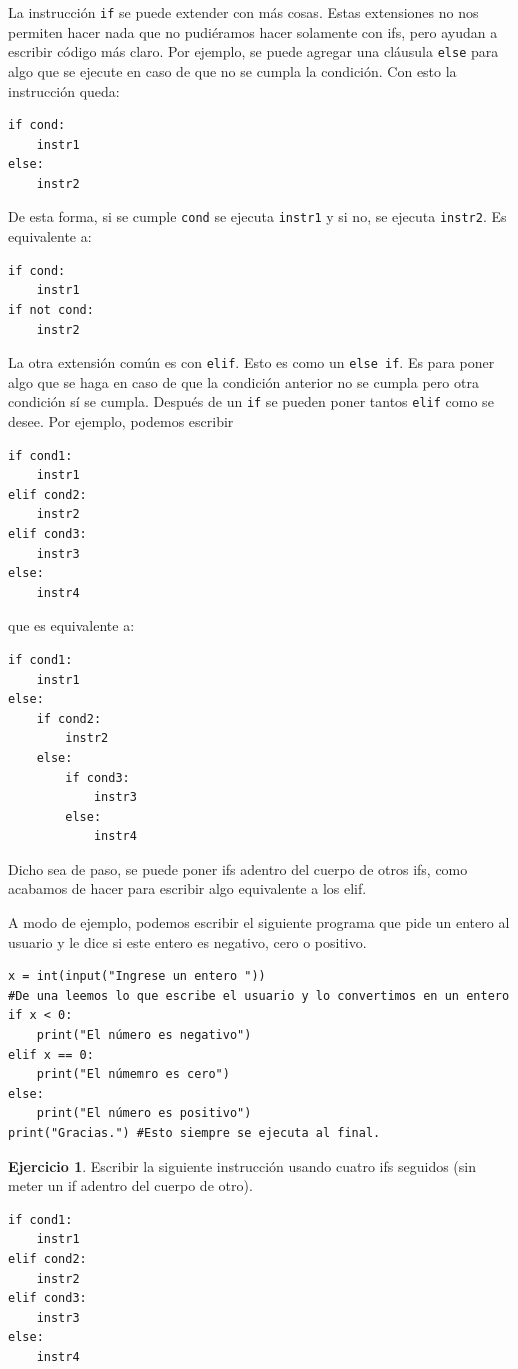 \documentclass[a4paper, 12pt]{report}
\theoremstyle{definition}
\newtheorem{ejercicio}{Ejercicio}[section]
\begin{document}
La instrucción {\tt if} se puede extender con más cosas. Estas extensiones no nos permiten hacer nada que no pudiéramos hacer solamente con ifs, pero ayudan a escribir código más claro. Por ejemplo, se puede agregar una cláusula {\tt else} para algo que se ejecute en caso de que no se cumpla la condición. Con esto la instrucción queda:
\begin{verbatim}
if cond:
    instr1
else:
    instr2
\end{verbatim}
De esta forma, si se cumple {\tt cond} se ejecuta {\tt instr1} y si no, se ejecuta {\tt instr2}. Es equivalente a:
\begin{verbatim}
if cond:
    instr1
if not cond:
    instr2
\end{verbatim}

La otra extensión común es con {\tt elif}. Esto es como un {\tt else if}. Es para poner algo que se haga en caso de que la condición anterior no se cumpla pero otra condición sí se cumpla. Después de un {\tt if} se pueden poner tantos {\tt elif} como se desee. Por ejemplo, podemos escribir
\begin{verbatim}
if cond1:
    instr1
elif cond2:
    instr2
elif cond3:
    instr3
else:
    instr4
\end{verbatim}
que es equivalente a:
\begin{verbatim}
if cond1:
    instr1
else:
    if cond2:
        instr2
    else:
        if cond3:
            instr3
        else:
            instr4
\end{verbatim}
Dicho sea de paso, se puede poner ifs adentro del cuerpo de otros ifs, como acabamos de hacer para escribir algo equivalente a los elif.

A modo de ejemplo, podemos escribir el siguiente programa que pide un entero al usuario y le dice si este entero es negativo, cero o positivo.
\begin{verbatim}
x = int(input("Ingrese un entero "))
#De una leemos lo que escribe el usuario y lo convertimos en un entero
if x < 0:
    print("El número es negativo")
elif x == 0:
    print("El númemro es cero")
else:
    print("El número es positivo")
print("Gracias.") #Esto siempre se ejecuta al final.
\end{verbatim}

\begin{ejercicio}
	Escribir la siguiente instrucción usando cuatro ifs seguidos (sin meter un if adentro del cuerpo de otro).
\begin{verbatim}
if cond1:
    instr1
elif cond2:
    instr2
elif cond3:
    instr3
else:
    instr4
\end{verbatim}

\end{ejercicio}
\end{document}
